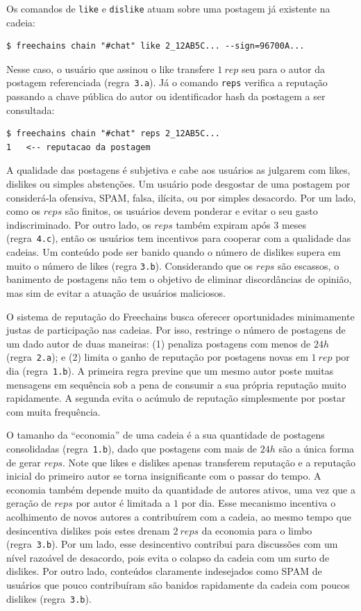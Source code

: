 \documentclass[12pt]{article}
\newcommand{\FC} {Freechains\xspace}
\begin{document}
Os comandos de \texttt{like} e \texttt{dislike} atuam sobre uma postagem já
existente na cadeia:
%
{\footnotesize
\begin{verbatim}
$ freechains chain "#chat" like 2_12AB5C... --sign=96700A...
\end{verbatim}
}
%
Nesse caso, o usuário que assinou o like transfere $1~rep$ seu para o autor da
postagem referenciada (regra~\texttt{3.a}).
%
Já o comando \texttt{reps} verifica a reputação passando a chave pública do
autor ou identificador hash da postagem a ser consultada:
%
{\footnotesize
\begin{verbatim}
$ freechains chain "#chat" reps 2_12AB5C...
1   <-- reputacao da postagem
\end{verbatim}
}

A qualidade das postagens é subjetiva e cabe aos usuários as julgarem com
likes, dislikes ou simples abstenções.
Um usuário pode desgostar de uma postagem por considerá-la ofensiva, SPAM,
falsa, ilícita, ou por simples desacordo.
Por um lado, como os $reps$ são finitos, os usuários devem ponderar e evitar o
seu gasto indiscriminado.
Por outro lado, os $reps$ também expiram após 3 meses (regra~\texttt{4.c}),
então os usuários tem incentivos para cooperar com a qualidade das cadeias.
Um conteúdo pode ser banido quando o número de dislikes supera em muito o
número de likes (regra \texttt{3.b}).
Considerando que os $reps$ são escassos, o banimento de postagens não tem o
objetivo de eliminar discordâncias de opinião, mas sim de evitar a atuação de
usuários maliciosos.

O sistema de reputação do \FC busca oferecer oportunidades minimamente justas
de participação nas cadeias.
Por isso, restringe o número de postagens de um dado autor de duas maneiras:
    (1) penaliza postagens com menos de $24h$ (regra~\texttt{2.a}); e
    (2) limita o ganho de reputação por postagens novas em $1~rep$ por dia
        (regra~\texttt{1.b}).
A primeira regra previne que um mesmo autor poste muitas mensagens em sequência
sob a pena de consumir a sua própria reputação muito rapidamente.
A segunda evita o acúmulo de reputação simplesmente por postar com muita
frequência.

O tamanho da ``economia'' de uma cadeia é a sua quantidade de postagens
consolidadas (regra~\texttt{1.b}), dado que postagens com mais de $24h$ são a
única forma de gerar $reps$.
Note que likes e dislikes apenas transferem reputação e a reputação inicial do
primeiro autor se torna insignificante com o passar do tempo.
A economia também depende muito da quantidade de autores ativos, uma vez que
a geração de $reps$ por autor é limitada a $1$ por dia.
Esse mecanismo incentiva o acolhimento de novos autores a contribuírem com a
cadeia, ao mesmo tempo que desincentiva dislikes pois estes drenam $2~reps$ da
economia para o limbo (regra~\texttt{3.b}).
Por um lado, esse desincentivo contribui para discussões com um nível razoável
de desacordo, pois evita o colapso da cadeia com um surto de dislikes.
Por outro lado, conteúdos claramente indesejados como SPAM de usuários que
pouco contribuíram são banidos rapidamente da cadeia com poucos dislikes
(regra~\texttt{3.b}).
\end{document}
